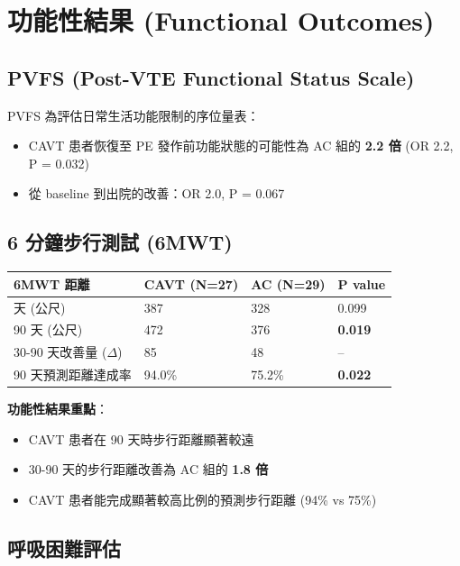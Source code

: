 \documentclass[11pt,a4paper]{article}
\begin{document}
\section{功能性結果 (Functional Outcomes)}

\subsection{PVFS (Post-VTE Functional Status Scale)}

PVFS 為評估日常生活功能限制的序位量表：
\begin{itemize}[leftmargin=*,itemsep=2pt]
    \item CAVT 患者恢復至 PE 發作前功能狀態的可能性為 AC 組的 \textbf{2.2 倍} (OR 2.2, P = 0.032)
    \item 從 baseline 到出院的改善：OR 2.0, P = 0.067
\end{itemize}

\subsection{6 分鐘步行測試 (6MWT)}

\begin{longtable}{p{5cm}p{3.5cm}p{3.5cm}p{2cm}}
\toprule
\textbf{6MWT 距離} & \textbf{CAVT (N=27)} & \textbf{AC (N=29)} & \textbf{P value} \\
\midrule
\endfirsthead
\bottomrule
\endfoot
30 天 (公尺) & 387 & 328 & 0.099 \\
\midrule
90 天 (公尺) & 472 & 376 & \textbf{0.019} \\
\midrule
30-90 天改善量 ($\Delta$) & 85 & 48 & -- \\
\midrule
90 天預測距離達成率 & 94.0\% & 75.2\% & \textbf{0.022} \\
\bottomrule
\end{longtable}

\begin{importantbox}
\textbf{功能性結果重點}：
\begin{itemize}[leftmargin=*,itemsep=2pt]
    \item CAVT 患者在 90 天時步行距離顯著較遠
    \item 30-90 天的步行距離改善為 AC 組的 \textbf{1.8 倍}
    \item CAVT 患者能完成顯著較高比例的預測步行距離 (94\% vs 75\%)
\end{itemize}
\end{importantbox}

\subsection{呼吸困難評估}
\end{document}
